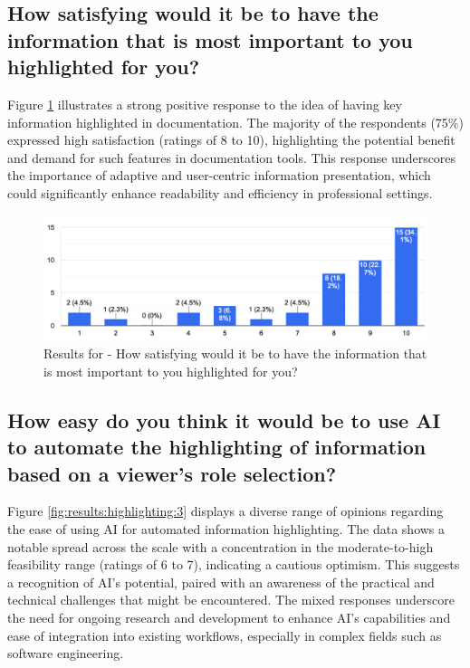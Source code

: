 \pagebreak

\subsection*{How satisfying would it be to have the information that is most important to you highlighted for you?}
Figure \ref{fig:results:highlighting:2} illustrates a strong positive response to the idea of having key information highlighted in documentation. The majority of the respondents (75\%) expressed high satisfaction (ratings of 8 to 10), highlighting the potential benefit and demand for such features in documentation tools. This response underscores the importance of adaptive and user-centric information presentation, which could significantly enhance readability and efficiency in professional settings.

\begin{figure}[h!]
\centering
\includegraphics[width=\linewidth]{Images/Survey/documents_2.png}
\caption{Results for - How satisfying would it be to have the information that is most important to you highlighted for you?}
\label{fig:results:highlighting:2}
\end{figure}

\pagebreak


\subsection*{How easy do you think it would be to use \ac{AI} to automate the highlighting of information based on a viewer's role selection?}
Figure \ref{fig:results:highlighting:3} displays a diverse range of opinions regarding the ease of using \ac{AI} for automated information highlighting. The data shows a notable spread across the scale with a concentration in the moderate-to-high feasibility range (ratings of 6 to 7), indicating a cautious optimism. This suggests a recognition of \ac{AI}'s potential, paired with an awareness of the practical and technical challenges that might be encountered. The mixed responses underscore the need for ongoing research and development to enhance \ac{AI}'s capabilities and ease of integration into existing workflows, especially in complex fields such as software engineering.


